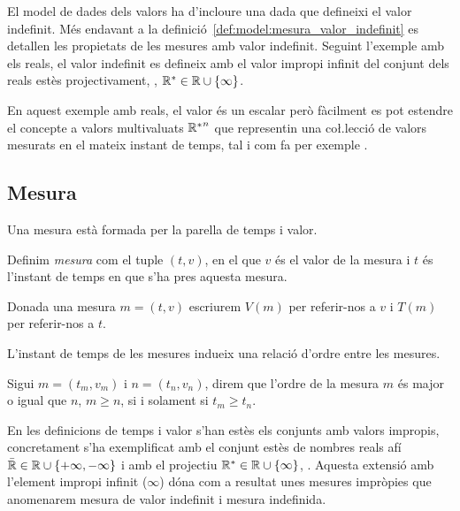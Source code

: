 

El model de dades dels valors ha d'incloure una dada que defineixi el
valor indefinit. Més endavant a la
definició~\ref{def:model:mesura_valor_indefinit} es detallen les
propietats de les mesures amb valor indefinit. Seguint l'exemple amb
els reals, el valor indefinit es defineix amb el valor impropi infinit
del conjunt dels reals estès
projectivament, \parencite{cantrell:projectivelyextendedreal},
$\mathbb{R}{}^*\in\mathbb{R}{} \cup \{\infty\}$.


En aquest exemple amb reals, el valor és un escalar però fàcilment es
pot estendre el concepte a valors multivaluats ${\mathbb{R}{}^*}^n$ que
representin una co\l.lecció de valors mesurats en el mateix instant de
temps, tal i com fa per exemple \textcite{assfalg08:thesis}.







\subsection{Mesura}\label{sec:model:mesura} 

Una mesura està formada per la parella de temps i valor.

\begin{definition}[Mesura]
  \label{def:model:mesura}
  Definim \emph{mesura} com el tuple $(t,v)$, en el que $v$ és el
  valor de la mesura i $t$ és l'instant de temps en que s'ha pres
  aquesta mesura.
\end{definition}


Donada una mesura $m=(t,v)$ escriurem $V(m)$ per referir-nos a $v$ i
$T(m)$ per referir-nos a $t$.

L'instant de temps de les mesures indueix una relació d'ordre entre
les mesures.
\begin{definition}
  \label{def:model:mesura-relacio-ordre}
  Sigui $m=(t_m,v_m)$ i $n=(t_n,v_n)$, direm que l'ordre de la mesura
  $m$ és major o igual que $n$, $m\geq n$, si i solament si $t_m\geq
  t_n$.
\end{definition}


En les definicions de temps i valor s'han estès els conjunts amb
valors impropis, concretament s'ha exemplificat amb el conjunt estès
de nombres reals afí $\bar{\mathbb{R}{}} \in \mathbb{R}{} \cup
\{+\infty,-\infty\}$ i amb el projectiu $\mathbb{R}{}^*\in\mathbb{R}{}
\cup\{\infty\}$,
\parencite{cantrell:extendedreal,cantrell:projectivelyextendedreal}. Aquesta
extensió amb l'element impropi infinit ($\infty$) dóna com a resultat
unes mesures impròpies que anomenarem mesura de valor indefinit i
mesura indefinida.

